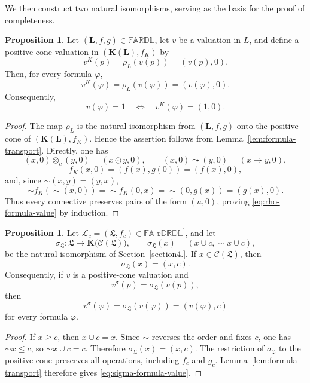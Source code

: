 \documentclass[final,12pt,times]{elsarticle}
\theoremstyle{plain}
\theoremstyle{definition}
\newtheorem{proposition}[definition]{Proposition}
\theoremstyle{break}
\newcommand{\FARDL}{\mathbb{FARDL}}
\newcommand{\CFADp}{\mathbb{FA\text{-}cDRDL}^{\prime}}
\begin{document}
We then construct two natural isomorphisms, serving as the basis for the proof of completeness.

\begin{proposition}
\label{prop:rho-formula-transport}
Let \((\mathbf L,f,g)\in\FARDL\), let \(v\) be a valuation in \(L\), and
define a positive-cone valuation in \((\mathbf K(\mathbf{L}),f_K)\) by
\[
 v^K(p)=\rho_L(v(p))=(v(p),0).
\]
Then, for every formula \(\varphi\),
\begin{equation}
 v^K(\varphi)=\rho_L(v(\varphi))=(v(\varphi),0).
 \label{eq:rho-formula-value}
\end{equation}
Consequently,
\[
 v(\varphi)=1
 \quad\Longleftrightarrow\quad
 v^K(\varphi)=(1,0).
\]
\end{proposition}

\begin{proof}
The map \(\rho_L\) is the natural isomorphism from \((\mathbf L,f,g)\) onto
the positive cone of \((\mathbf K(\mathbf{L}),f_K)\).  Hence the assertion follows
from Lemma~\ref{lem:formula-transport}.  Directly, one has
\[
 (x,0)\otimes_c(y,0)=(x\odot y,0),
 \qquad
 (x,0)\leadsto(y,0)=(x\to y,0),
\]
\[
 f_K(x,0)=(f(x),g(0))=(f(x),0),
\]
and, since \({\sim}(x,y)=(y,x)\),
\[
 {\sim}f_K({\sim}(x,0))
 ={\sim}f_K(0,x)
 ={\sim}(0,g(x))
 =(g(x),0).
\]
Thus every connective preserves pairs of the form \((u,0)\), proving
\eqref{eq:rho-formula-value} by induction.
\end{proof}

\begin{proposition}
\label{prop:sigma-formula-transport}
Let \(\mathcal{\mathscr L}_c=(\boldsymbol{\mathfrak L},f_c)\in\CFADp\), and
let
\[
 \sigma_{\boldsymbol{\mathfrak L}}:
 \boldsymbol{\mathfrak L}\longrightarrow
 \mathbf K\bigl(\mathcal C(\boldsymbol{\mathfrak L})\bigr),
 \qquad
 \sigma_{\boldsymbol{\mathfrak L}}(x)
 =(x\cup c,{\sim}x\cup c),
\]
be the natural isomorphism of Section~\ref{section4.}.  If
\(x\in\mathcal C(\boldsymbol{\mathfrak L})\), then
\[
 \sigma_{\boldsymbol{\mathfrak L}}(x)=(x,c).
\]
Consequently, if \(v\) is a positive-cone valuation and
\[
 v^{\sigma}(p)=\sigma_{\boldsymbol{\mathfrak L}}(v(p)),
\]
then
\begin{equation}
 v^{\sigma}(\varphi)
 =\sigma_{\boldsymbol{\mathfrak L}}(v(\varphi))
 =(v(\varphi),c)
 \label{eq:sigma-formula-value}
\end{equation}
for every formula \(\varphi\).
\end{proposition}

\begin{proof}
If \(x\geq c\), then \(x\cup c=x\).  Since \({\sim}\) reverses the order
and fixes \(c\), one has \({\sim}x\leq c\), so
\({\sim}x\cup c=c\).  Therefore
\(\sigma_{\boldsymbol{\mathfrak L}}(x)=(x,c)\).  The restriction of
\(\sigma_{\boldsymbol{\mathfrak L}}\) to the positive cone preserves all
operations, including \(f_c\) and \(g_c\).  Lemma~\ref{lem:formula-transport}
therefore gives \eqref{eq:sigma-formula-value}.
\end{proof}
\end{document}
